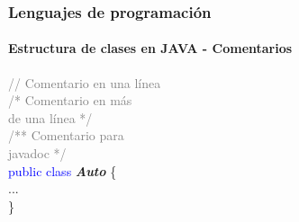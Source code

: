 \documentclass{beamer}
\begin{document}
		\begin{frame}
			\frametitle{Lenguajes de programaci\'on}
			\framesubtitle{Estructura de clases en JAVA - Comentarios}

			\begin{block}{}
				\textcolor{gray}{// Comentario en una l\'inea} \\
				\textcolor{gray}{/* Comentario en m\'as} \\
				\textcolor{gray}{ de una l\'inea */} \\
				\textcolor{gray}{/** Comentario para} \\
				\textcolor{gray}{ javadoc */} \\
				\textcolor{blue}{public class} \textbf{\emph{Auto}} \{ \\
				\hspace{1cm} ... \\
				\}
			\end{block}
			
		\end{frame}
\end{document}
